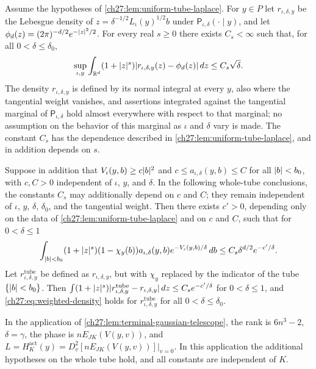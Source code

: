 \begin{corollary}\label{ch27:cor:weighted-tube-density}
Assume the hypotheses of \cref{ch27:lem:uniform-tube-laplace}. For $y\in P$ let $r_{\iota,\delta,y}$ be the Lebesgue density of $z=\delta^{-1/2}L_\iota(y)^{1/2}b$ under $\mathsf P_{\iota,\delta}(\cdot\mid y)$, and let $\phi_d(z)=(2\pi)^{-d/2}e^{-\lvert z\rvert^2/2}$. For every real $s\ge0$ there exists $C_s<\infty$ such that, for all $0<\delta\le\delta_0$,
\begin{equation}\label{ch27:eq:weighted-density}
 \sup_{\iota,y}\int_{\mathbb R^d}(1+\lvert z\rvert^s)\lvert r_{\iota,\delta,y}(z)-\phi_d(z)\rvert\,dz\le C_s\sqrt\delta.
\end{equation}
The density $r_{\iota,\delta,y}$ is defined by its normal integral at every $y$, also where the tangential weight vanishes, and assertions integrated against the tangential marginal of $\mathsf P_{\iota,\delta}$ hold almost everywhere with respect to that marginal; no assumption on the behavior of this marginal as $\iota$ and $\delta$ vary is made. The constant $C_s$ has the dependence described in \cref{ch27:lem:uniform-tube-laplace}, and in addition depends on $s$.

Suppose in addition that $V_\iota(y,b)\ge c\lvert b\rvert^2$ and $c\le a_{\iota,\delta}(y,b)\le C$ for all $\lvert b\rvert<b_0$, with $c,C>0$ independent of $\iota$, $y$, and $\delta$. In the following whole-tube conclusions, the constants $C_s$ may additionally depend on $c$ and $C$; they remain independent of $\iota$, $y$, $\delta$, $\delta_0$, and the tangential weight. Then there exists $c'>0$, depending only on the data of \cref{ch27:lem:uniform-tube-laplace} and on $c$ and $C$, such that for $0<\delta\le1$
\begin{equation}\label{ch27:eq:tube-tail}
 \int_{\lvert b\rvert<b_0}(1+\lvert z\rvert^s)(1-\chi_y(b))a_{\iota,\delta}(y,b)e^{-V_\iota(y,b)/\delta}\,db\le C_s\delta^{d/2}e^{-c'/\delta}.
\end{equation}
Let $r^{\mathrm{tube}}_{\iota,\delta,y}$ be defined as $r_{\iota,\delta,y}$, but with $\chi_y$ replaced by the indicator of the tube $\{\lvert b\rvert<b_0\}$. Then $\int(1+\lvert z\rvert^s)\lvert r^{\mathrm{tube}}_{\iota,\delta,y}-r_{\iota,\delta,y}\rvert\,dz\le C_se^{-c'/\delta}$ for $0<\delta\le1$, and \eqref{ch27:eq:weighted-density} holds for $r^{\mathrm{tube}}_{\iota,\delta,y}$ for all $0<\delta\le\delta_0$.

In the application of \cref{ch27:lem:terminal-gaussian-telescope}, the rank is $6n^3-2$, $\delta=\gamma$, the phase is $nE_{JK}(V(y,v))$, and $L=H_K^{\mathrm{act}}(y)=D_v^2[nE_{JK}(V(y,v))]|_{v=0}$. In this application the additional hypotheses on the whole tube hold, and all constants are independent of $K$.
\end{corollary}

